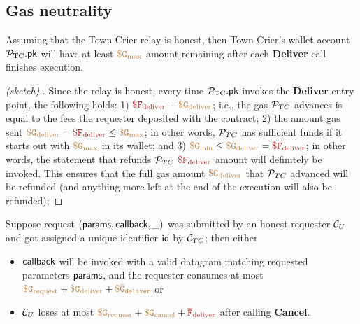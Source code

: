 \subsection{Gas neutrality}

\begin{theorem}
Assuming that the Town Crier relay is honest, 
then Town Crier's wallet account ${\mathcal{P}}_{\text{TC}}.{\sf pk}$ 
will have at least $\tt {\color{brown} \$ G_{\text{max}} }$
amount remaining after each {\bf Deliver}  
call finishes execution.
\end{theorem}
\begin{proof}[(sketch).]
Since the relay is honest, every time 
${\mathcal{P}}_{\text{TC}}.{\sf pk}$ invokes the {\bf Deliver}
entry point, the following holds:
1) 
$\smaroon{\$ F_{\text{deliver}}}
= \sbrown{\$ G_{\text{deliver}}}$;
i.e., the gas ${\cal P}_{TC}$ advances is equal
to the fees the 
requester deposited with the \tcont contract;
2)
the amount gas sent 
$\sbrown{\$ G_{\text{deliver}}} = 
\smaroon{\$ F_{\text{deliver}}}
\leq 
\sbrown{\$ G_{\text{max}}} 
$;
in other words, 
${\cal P}_{TC}$ has sufficient funds  
if it starts out with $\tt {\color{brown} \$ G_{\text{max}} }$
in its wallet;
and
3) 
$\sbrown{\$ G_{\text{min}}} \leq
\sbrown{\$ G_{\text{deliver}}} = 
\smaroon{\$ F_{\text{deliver}}}
$; in other words, the statement that refunds
${\cal P}_{TC}$ 
$\smaroon{\$ F_{\text{deliver}}}$
amount will definitely be invoked. This 
ensures that the full gas amount 
$\tt {\color{brown} \$ G_{\text{deliver}} }$
that ${\cal P}_{TC}$ advanced will be refunded (and anything more left
at the end of the execution will also be refunded);
\end{proof}





\begin{theorem}
Suppose request $({\sf params}, {\sf callback}, \_)$ was submitted
by an honest requester ${\cal C}_U$ and got assigned a unique identifier
${\sf id}$ by ${\cal C}_{TC}$;
then 
either 
\begin{itemize}
\item ${\sf callback}$ will be invoked  
with a valid datagram matching requested parameters
${\sf params}$,
and the requester consumes at most
$\tt {\color{brown} \$ G_{\text{request}} } + \tt {\color{brown} \$ G_{\text{deliver}} } + \tt {\color{brown} \$ \overline{G}_{deliver} } $
or 
\item
${\cal C}_U$ 
loses at most 
$\sbrown{\$ G_{\text{request}}} + \sbrown{\$ G_{\text{cancel}}} + \smaroon{\overline{F}_{\text{deliver}}}$ after calling {\bf Cancel}.
\end{itemize}
\end{theorem}

